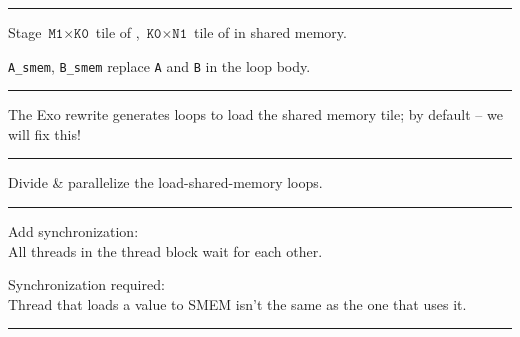 \newpage
{}

{\large

}

\vspace{3mm}
\hrule

{\LARGE
Stage $\texttt{M1} \times \texttt{K0}$ tile of , $\texttt{K0} \times \texttt{N1}$ tile of  in shared memory.

\texttt{A\_smem}, \texttt{B\_smem} replace \texttt{A} and \texttt{B} in the loop body.

}

\newpage
{}

{\large

}

\vspace{3mm}
\hrule

{\LARGE
The Exo rewrite generates loops to load the shared memory tile;
 by default -- we will fix this!

}

\newpage
{}

{\large

}

\vspace{3mm}
\hrule

{\LARGE
Divide \& parallelize the load-shared-memory loops.
}

\newpage
{}

{\large

}

\vspace{3mm}
\hrule

{\LARGE
Add synchronization:\\
All threads in the thread block wait for each other.
}

\newpage
{}

{\LARGE
Synchronization required:\\
Thread that loads a value to SMEM isn't the same as the one that uses it.

}

\vfill
\hrule
\vfill

\begin{center}
\Large
\begin{tikzpicture}[node distance=0mm]

\end{tikzpicture}
\end{center}

